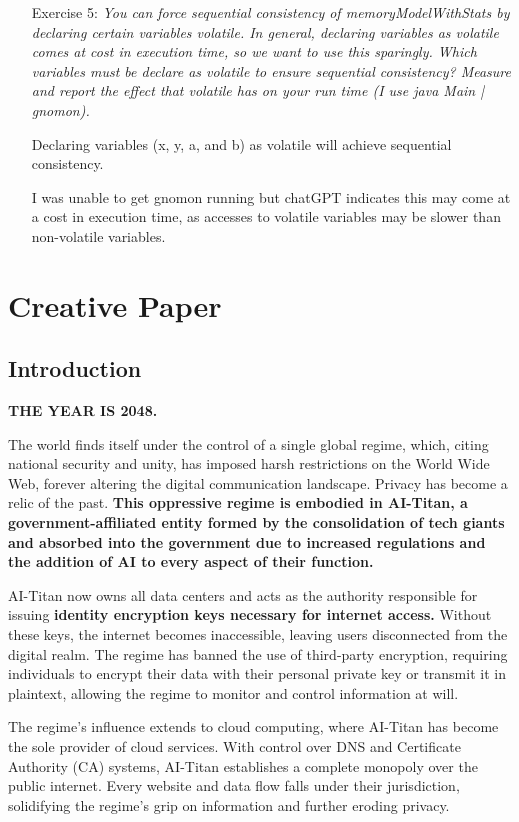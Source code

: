 \documentclass{article}
\theoremstyle{theorem}
\theoremstyle{definition}
\theoremstyle{remark}
\begin{document}
\begin{itemize}
    \item[Exercise 5:] \textit{You can force sequential consistency of memoryModelWithStats by declaring certain variables volatile. In general, declaring variables as volatile comes at cost in execution time, so we want to use this sparingly. Which variables must be declare as volatile to ensure sequential consistency? Measure and report the effect that volatile has on your run time (I use java Main | gnomon).}

    Declaring variables (x, y, a, and b) as volatile will achieve sequential consistency. 

    I was unable to get gnomon running but chatGPT indicates this may come at a cost in execution time, as accesses to volatile variables may be slower than non-volatile variables.



\end{itemize}

\section{Creative Paper}
\subsection{Introduction}

\textbf{THE YEAR IS 2048.}

The world finds itself under the control of a single global regime, which, citing national security and unity, has imposed harsh restrictions on the World Wide Web, forever altering the digital communication landscape. Privacy has become a relic of the past. \textbf{This oppressive regime is embodied in AI-Titan, a government-affiliated entity formed by the consolidation of tech giants and absorbed into the government due to increased regulations and the addition of AI to every aspect of their function.}

AI-Titan now owns all data centers and acts as the authority responsible for issuing \textbf{identity encryption keys necessary for internet access.} Without these keys, the internet becomes inaccessible, leaving users disconnected from the digital realm. The regime has banned the use of third-party encryption, requiring individuals to encrypt their data with their personal private key or transmit it in plaintext, allowing the regime to monitor and control information at will.

The regime's influence extends to cloud computing, where AI-Titan has become the sole provider of cloud services. With control over DNS and Certificate Authority (CA) systems, AI-Titan establishes a complete monopoly over the public internet. Every website and data flow falls under their jurisdiction, solidifying the regime's grip on information and further eroding privacy.
\end{document}
